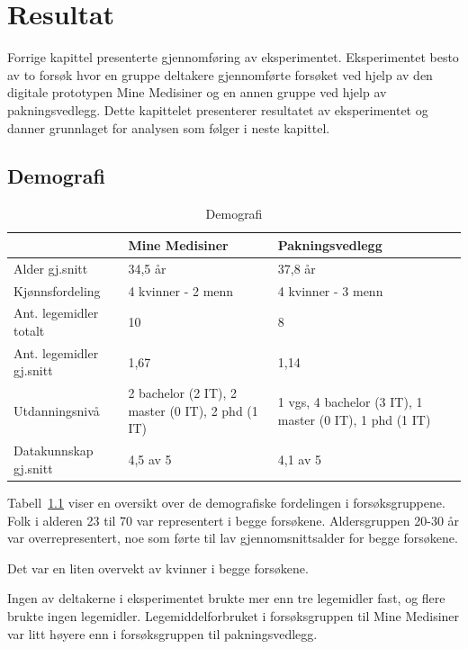\chapter{Resultat}\label{chap:resultat}

Forrige kapittel presenterte gjennomføring av eksperimentet. Eksperimentet besto av to forsøk hvor en gruppe deltakere gjennomførte forsøket ved hjelp av den digitale prototypen Mine Medisiner og en annen gruppe ved hjelp av pakningsvedlegg. Dette kapittelet presenterer resultatet av eksperimentet og danner grunnlaget for analysen som følger i neste kapittel.

\section{Demografi}

\begin{table}[H]
    \centering
    \begin{tabular}{ | p{3.4cm} | p{3.7cm} | p{3.7cm} |  }
      \hline
        & \textbf{Mine Medisiner} & \textbf{Pakningsvedlegg} \\ \hline
        Alder gj.snitt & 34,5 år & 37,8 år \\ \hline
        Kjønnsfordeling & 4 kvinner - 2 menn  & 4 kvinner - 3 menn \\ \hline
        Ant. legemidler totalt & 10 & 8\\ \hline
        Ant. legemidler gj.snitt &  1,67 & 1,14\\ \hline
        Utdanningsnivå & 2 bachelor (2 IT), 2 master (0 IT), 2 phd (1 IT) & 1 vgs, 4 bachelor (3 IT), 1 master (0 IT), 1 phd (1 IT)\\ \hline
        Datakunnskap gj.snitt & 4,5 av 5 &  4,1 av 5 \\ \hline
    \end{tabular}
    \caption{Demografi}
    \label{tab:demografisammenligning}
\end{table}

Tabell~\ref{tab:demografisammenligning} viser en oversikt over de demografiske fordelingen i forsøksgruppene. Folk i alderen 23 til 70 var representert i begge forsøkene. Aldersgruppen 20-30 år var overrepresentert, noe som førte til lav gjennomsnittsalder for begge forsøkene. 

Det var en liten overvekt av kvinner i begge forsøkene. 

Ingen av deltakerne i eksperimentet brukte mer enn tre legemidler fast, og flere brukte ingen legemidler. Legemiddelforbruket i forsøksgruppen til Mine Medisiner var litt høyere enn i forsøksgruppen til pakningsvedlegg. 

